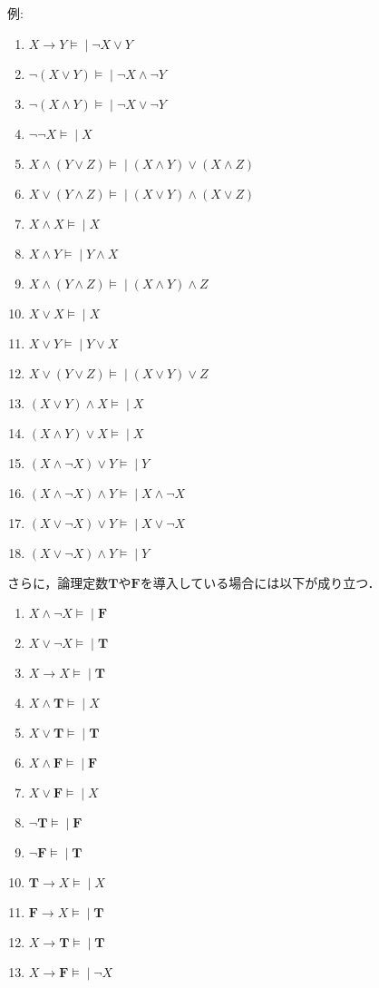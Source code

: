 \documentclass{ltjsarticle}
\theoremstyle{mystyle1}
\theoremstyle{mystyle2}
\newcommand{\bT}{\ensuremath{\mathbf{T}}}
\newcommand{\bF}{\ensuremath{\mathbf{F}}}
\newcommand{\lequiv}{\ensuremath{\models\!\mid}}
\begin{document}
例:
\begin{enumerate}
  \item $X\to Y\lequiv\neg X\vee Y$
  \item $\neg\left(X\vee Y\right)\lequiv\neg X\wedge\neg Y$
  \item $\neg\left(X\wedge Y\right)\lequiv\neg X\vee\neg Y$
  \item $\neg\neg X\lequiv X$
  \item $X\wedge\left(Y\vee Z\right)\lequiv\left(X\wedge Y\right)\vee\left(X\wedge Z\right)$
  \item $X\vee\left(Y\wedge Z\right)\lequiv\left(X\vee Y\right)\wedge\left(X\vee Z\right)$
  \item $X\wedge X\lequiv X$
  \item $X\wedge Y\lequiv Y\wedge X$
  \item $X\wedge\left(Y\wedge Z\right)\lequiv\left(X\wedge Y\right)\wedge Z$
  \item $X\vee X\lequiv X$
  \item $X\vee Y\lequiv Y\vee X$
  \item $X\vee\left(Y\vee Z\right)\lequiv\left(X\vee Y\right)\vee Z$
  \item $\left(X\vee Y\right)\wedge X\lequiv X$
  \item $\left(X\wedge Y\right)\vee X\lequiv X$
  \item $\left(X\wedge\neg X\right)\vee Y\lequiv Y$
  \item $\left(X\wedge\neg X\right)\wedge Y\lequiv X\wedge\neg X$
  \item $\left(X\vee\neg X\right)\vee Y\lequiv X\vee\neg X$
  \item $\left(X\vee\neg X\right)\wedge Y\lequiv Y$
\end{enumerate}
さらに，論理定数$\bT$や$\bF$を導入している場合には以下が成り立つ．
\begin{enumerate}
  \item $X\wedge\neg X\lequiv\bF$
  \item $X\vee\neg X\lequiv\bT$
  \item $X\to X\lequiv\bT$
  \item $X\wedge\bT\lequiv X$
  \item $X\vee\bT\lequiv\bT$
  \item $X\wedge\bF\lequiv\bF$
  \item $X\vee\bF\lequiv X$
  \item $\neg\bT\lequiv\bF$
  \item $\neg\bF\lequiv\bT$
  \item $\bT\to X\lequiv X$
  \item $\bF\to X\lequiv\bT$
  \item $X\to \bT\lequiv\bT$
  \item $X\to \bF\lequiv\neg X$
\end{enumerate}
\end{document}
